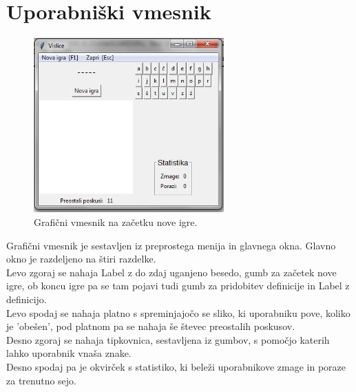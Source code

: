 \documentclass [a4paper, 12pt] {article}
\begin{document}
\section {Uporabniški vmesnik}
\begin {figure} [h]
\centering
\includegraphics [height=190pt] {slike/za_porocilo_gui.png}
\caption {Grafični vmesnik na začetku nove igre.}
\end {figure}
\noindent Grafični vmesnik je sestavljen iz preprostega menija in glavnega okna.  Glavno okno je razdeljeno na štiri razdelke. \\
Levo zgoraj se nahaja Label z do zdaj uganjeno besedo, gumb za začetek nove igre, ob koncu igre pa se tam pojavi tudi gumb za pridobitev definicije in Label z definicijo. \\
Levo spodaj se nahaja platno s spreminjajočo se sliko, ki uporabniku pove, koliko je 'obešen', pod platnom pa se nahaja še števec preostalih poskusov.  \\
Desno zgoraj se nahaja tipkovnica, sestavljena iz gumbov, s pomočjo katerih lahko uporabnik vnaša znake. \\
Desno spodaj pa je okvirček s statistiko, ki beleži uporabnikove zmage in poraze za trenutno sejo. 
\end{document}
